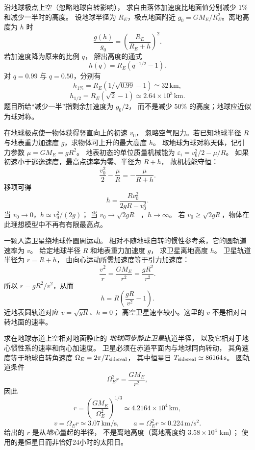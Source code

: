 沿地球极点上空（忽略地球自转影响），
求自由落体加速度比地面值分别减少
$1\%$ 和减少一半时的高度。
\exsolution
设地球半径为 $R_E$，极点地面附近
$g_0=GM_E/R_E^2$。离地高度为 $h$ 时
\[
\frac{g(h)}{g_0}
=\left(\frac{R_E}{R_E+h}\right)^2.
\]
若加速度降为原来的比例 $q$，
解出高度的通式
\[
\boxed{h(q)=R_E(q^{-1/2}-1)}.
\]
对 $q=0.99$ 与 $q=0.50$，分别有
\[
\boxed{h_{1\%}=R_E(1/\sqrt{0.99}-1)
\simeq32\,\mathrm{km}},
\]
\[
\boxed{h_{1/2}=R_E(\sqrt2-1)
\simeq2.64\times10^3\,\mathrm{km}}.
\]
\excheck 题目所给“减少一半”指剩余加速度为 $g_0/2$，
而不是减少 $50\%$ 的高度；地球应近似为球对称。

在地球极点使一物体获得竖直向上的初速 $v_0$，
忽略空气阻力。若已知地球半径 $R$ 与地表重力加速度
$g$，求物体可上升的最大高度 $h$。
\exsolution
取地球为球对称天体，记引力参数
$\mu=GM_E=gR^2$。
地表初态的单位质量机械能为
$\varepsilon_i=v_0^2/2-\mu/R$。
如果初速小于逃逸速度，最高点速率为零、半径为 $R+h$，
故机械能守恒：
\[
\frac{v_0^2}{2}-\frac{\mu}{R}
=-\frac{\mu}{R+h}.
\]
移项可得
\[
\boxed{h=\frac{Rv_0^2}{2gR-v_0^2}}.
\]
\excheck 当 $v_0\to0$，$h\simeq v_0^2/(2g)$；
当 $v_0\to\sqrt{2gR}^{\,-}$，$h\to\infty$。
若 $v_0\ge\sqrt{2gR}$，物体在此理想模型中不再有有限最高点。

一颗人造卫星绕地球作圆周运动。
相对不随地球自转的惯性参考系，它的圆轨道速率为 $v$。
给定地球半径 $R$ 和地表重力加速度 $g$，
求卫星离地高度 $h$。
\exsolution
卫星轨道半径为 $r=R+h$，
由向心运动所需加速度等于引力加速度：
\[
\frac{v^2}{r}=\frac{GM_E}{r^2}
=\frac{gR^2}{r^2}.
\]
所以 $r=gR^2/v^2$，从而
\[
\boxed{h=R\left(\frac{gR}{v^2}-1\right)}.
\]
\excheck 近地表圆轨道对应 $v=\sqrt{gR}$、$h=0$；
高空卫星速率较小。这里的 $v$ 不是相对自转地面的速率。

求在地球赤道上空相对地面静止的
\emph{地球同步静止卫星}轨道半径，
以及它相对于地心惯性系的速率和向心加速度。
\exsolution
卫星必须在赤道平面内与地球同向转动，
其角速度等于地球自转角速度
$\Omega_E=2\pi/T_{\rm sidereal}$，
其中恒星日 $T_{\rm sidereal}\simeq86164\,\mathrm s$。
圆轨道条件
\[
\Omega_E^2r=\frac{GM_E}{r^2},
\]
因此
\[
\boxed{r=\left(\frac{GM_E}{\Omega_E^2}\right)^{1/3}
\simeq4.2164\times10^4\,\mathrm{km}},
\]
\[
\boxed{v=\Omega_Er\simeq3.07\,\mathrm{km/s}},\qquad
\boxed{a=\Omega_E^2r\simeq0.224\,\mathrm{m/s^2}}.
\]
\excheck 给出的 $r$ 是从\emph{地心}量起的半径，
不是离地高度（离地高度约 $3.58\times10^4$ km）；
使用的是恒星日而非恰好24小时的太阳日。

